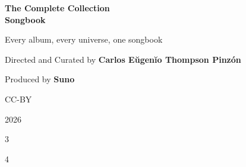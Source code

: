 \documentclass[a4paper,landscape]{memoir}
\begin{document}
\frontmatter

\begin{titlingpage}
\centering
\vspace*{\fill}
{\LARGE\bfseries The Complete Collection\\\Huge Songbook\par}
\bigskip
{\large Every album, every universe, one songbook\par}
\vspace*{\fill}
{\normalsize Directed and Curated by \bfseries Carlos Eŭgenĭo Thompson Pinzón\par}
{\normalsize Produced by \bfseries Suno\par}
\bigskip
{\normalsize CC-BY\par}
{\normalsize 2026\par}
\vspace*{\fill}
\end{titlingpage}

\begin{multicols*}{3}
\tableofcontents*
\end{multicols*}
\mainmatter
\begin{multicols*}{4}





\end{multicols*}
\appendix

\backmatter
\printindex[songs]
\clearpage
\printindex[tags]
\end{document}
